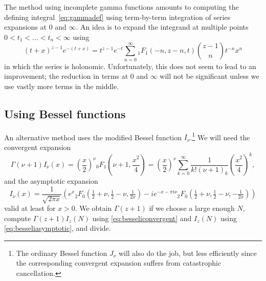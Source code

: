 \documentclass[reqno]{amsart}
\theoremstyle{definition}
\begin{document}
The method using incomplete gamma functions amounts
to computing the defining
integral~\eqref{eq:gammadef} using term-by-term integration of
series expansions at $0$ and $\infty$.
An idea is to expand the integrand at multiple points
$0 < t_1 < \ldots < t_n < \infty$
using
\begin{equation}
(t+x)^{z-1} e^{-(t+x)} = t^{z-1} e^{-t} \sum_{n=0}^{\infty} {}_1F_1(-n, z-n, t) {z-1 \choose n} t^{-n} x^n
\end{equation}
in which the series is holonomic.
Unfortunately, this does not seem to lead to an improvement;
the reduction in terms at $0$ and $\infty$ will not
be significant unless we use vastly more terms in the middle.

\subsection{Using Bessel functions}

An alternative method uses the
modified Bessel function $I_{\nu}$.\footnote{The ordinary Bessel function $J_{\nu}$ will also do the job, but less efficiently since
the corresponding convergent expansion suffers from catastrophic cancellation.}
We will need the convergent expansion
\begin{equation}
\Gamma(\nu+1) I_{\nu}(x) = \left(\frac{x}{2}\right)^{\nu} {}_0F_1\left(\nu+1, \frac{x^2}{4}\right)
=
\left(\frac{x}{2}\right)^{\nu} \sum_{k=0}^{\infty} \frac{1}{k! (\nu+1)_k} \left(\frac{x^2}{4}\right)^{k},
\label{eq:besseliconvergent}
\end{equation}
and the asymptotic expansion
\begin{equation}
I_{\nu}(x) = \frac{1}{\sqrt{2 \pi x}} \left(
    e^x {}_2F_0\left(\tfrac{1}{2}+\nu, \tfrac{1}{2}-\nu, \tfrac{1}{2x}\right) -
    i e^{-x-\pi i \nu} {}_2F_0\left(\tfrac{1}{2}+\nu, \tfrac{1}{2}-\nu, -\tfrac{1}{2x}\right) \right)
\label{eq:besseliasymptotic}
\end{equation}
valid at least for $x > 0$.
We obtain $\Gamma(z+1)$ if we
choose a large enough $N$, compute
$\Gamma(z+1) I_{z}(N)$ using \eqref{eq:besseliconvergent}
and $I_{z}(N)$ using \eqref{eq:besseliasymptotic},
and divide.
\end{document}
